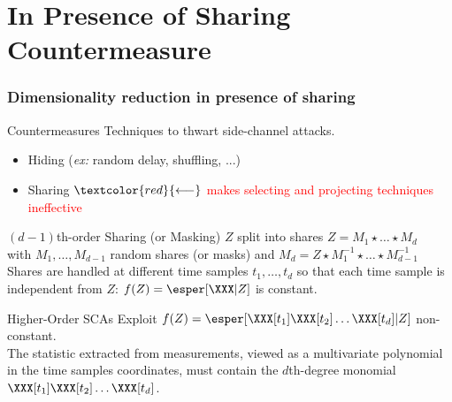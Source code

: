 \section{In Presence of Sharing Countermeasure}
\begin{frame}
\frametitle{Dimensionality reduction in presence of sharing}
\begin{block}{Countermeasures}
Techniques to thwart side-channel attacks. 
\begin{itemize}
\item Hiding (\emph{ex:} random delay, shuffling, ...)
\item Sharing  $\textcolor{red}{\longleftarrow}$ \textcolor{red}{makes selecting and projecting techniques ineffective}
\end{itemize}
\end{block}

\begin{block}{$(d-1)$th-order Sharing (or Masking)}
$Z$ split into shares  $Z = M_1 \star \dots \star M_d$ \\
with $M_1, \dots , M_{d-1}$ random shares (or masks) and $M_d = Z \star M_1^{-1}\star \dots \star M_{d-1}^{-1}$ \\
Shares are handled at different time samples $t_1,\dots, t_d$ so that each time sample is independent from $Z$: $f(Z) = \esper[\XXX\lvert Z]$ is constant.
\end{block}
\pause
\begin{block}{Higher-Order SCAs}
Exploit $f(Z) = \esper[\XXX[t_1]\XXX[t_2]\dots\XXX[t_d]\lvert Z]$ non-constant.\\
 
The statistic extracted from measurements, viewed as a multivariate polynomial in the time samples coordinates, must contain the $d$th-degree monomial $\XXX[t_1]\XXX[t_2]\dots\XXX[t_d]$.
\end{block}

\end{frame}

